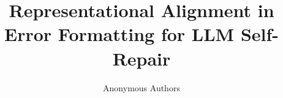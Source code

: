 \documentclass[11pt]{article}
\begin{document}
\title{Representational Alignment in Error Formatting for LLM Self-Repair}

\author{Anonymous Authors}

\date{}

\maketitle












\end{document}
